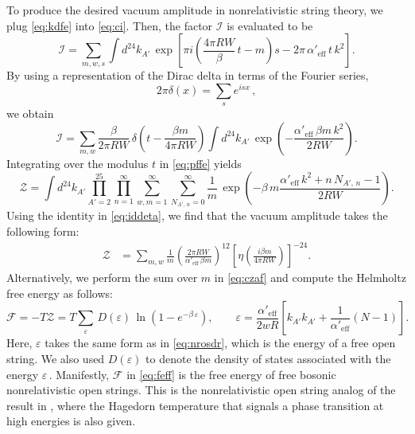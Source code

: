 \documentclass[11pt]{article}
\newcommand{\be}{\begin{equation}}
\newcommand{\ee}{\end{equation}}
\newcommand{\CI}{\mathcal{I}}
\newcommand{\lr}{\left (}
\newcommand{\rr}{\right )}
\newcommand{\ls}{\left [}
\newcommand{\rs}{\right ]}
\begin{document}
To produce the desired vacuum amplitude in nonrelativistic string theory, we plug \eqref{eq:kdfe} into \eqref{eq:ci}. Then, the factor $\CI$ is evaluated to be
%
\be
    \CI = \sum_{m, w, s} \int d^{24} k_{A'} \, \exp \! \ls \pi i \lr \frac{4\pi R W}{\beta} \, t - m \rr s - 2 \pi \, \alpha'_\text{eff} \, t \, k^2 \rs.
\ee
%
By using a representation of the Dirac delta in terms of the Fourier series,
%
\be
    2\pi \delta \lr x \rr = \sum_s e^{i s x}\,,
\ee
%
we obtain
%
\be
    \CI = \sum_{m,w} \frac{\beta}{2\pi R W} \, \delta \! \lr t - \frac{\beta m}{4\pi R W} \rr \int {d^{24} k_{A'}} \, \exp \! \lr - \frac{\alpha'_\text{eff} \, \beta m \, k^2}{2RW} \rr.
\ee
%
Integrating over the modulus $t$ in \eqref{eq:pffe} yields
%
\be \label{eq:czaf}
    \mathcal{Z} = \int d^{24} k_{A'} \prod_{A'=2}^{25} \prod_{n=1}^\infty \sum_{w, m =1}^\infty \sum_{N_{A'\!,\,n} = 0}^\infty \frac{1}{m} \, \exp \lr - \beta \, m \frac{\alpha'_\text{eff} \, k^2 + n \, N_{A'\!,\,n} - 1}{2RW} \rr. 
\ee
%
Using the identity in \eqref{eq:iddeta}, we find that the vacuum amplitude takes the following form:
%
\begin{align}\label{eq:torusfreeenergy}
    \mathcal{Z} 
    & = \sum_{m, w} \frac{1}{m} \lr \frac{2\pi RW}{\alpha'_\text{eff} \, \beta m} \rr^{\!12} \ls \eta \! \lr \frac{i \beta m}{4\pi R W} \rr \rs^{-24}\!.
\end{align}
%
Alternatively, 
we perform the sum over $m$ in \eqref{eq:czaf} and compute the Helmholtz free energy as follows:
%
\be \label{eq:feff}
    \mathscr{F} = - T \mathcal{Z} = T \sum_{\varepsilon} \, D(\varepsilon) \, \ln \lr 1 - e^{-\beta \, \varepsilon} \rr,
        \qquad%
    \varepsilon = \frac{\alpha'_\text{eff}}{2 w R} \ls k_{A'} k_{A'} + \frac{1}{\alpha'_\text{eff}} \lr N - 1 \rr \rs.
\ee
%
Here, $\varepsilon$ takes the same form as in \eqref{eq:nrosdr}, which is the energy of a free open string.
We also used $D(\varepsilon)$ to denote the density of states associated with the energy $\varepsilon$\,. Manifestly, $\mathscr{F}$ in \eqref{eq:feff} is the free energy of free bosonic nonrelativistic open strings. This is the nonrelativistic open string analog of the result in \cite{Gomis:2000bd}, where the Hagedorn temperature that signals a phase transition at high energies is also given.

\newpage



\end{document}
